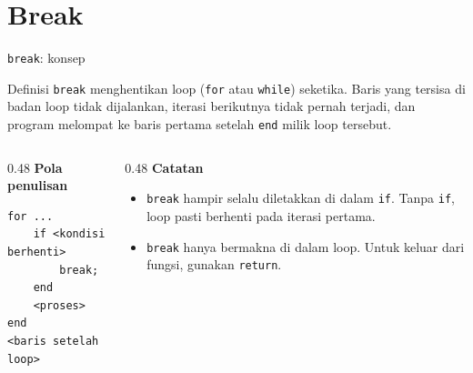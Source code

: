\documentclass[aspectratio=169,10pt]{beamer}
\newcommand{\kode}[1]{\texttt{#1}}
\begin{document}
\section{Break}

\begin{frame}[fragile]{\kode{break}: konsep}
  \begin{block}{Definisi}
    \kode{break} menghentikan loop (\kode{for} atau \kode{while}) \alert{seketika}. Baris yang tersisa
    di badan loop tidak dijalankan, iterasi berikutnya tidak pernah terjadi, dan program melompat ke
    \alert{baris pertama setelah \kode{end}} milik loop tersebut.
  \end{block}
  \vspace{4pt}
  \begin{columns}[T]
    \begin{column}{0.48\textwidth}
      \textbf{Pola penulisan}
\begin{lstlisting}
for ...
    if <kondisi berhenti>
        break;
    end
    <proses>
end
<baris setelah loop>
\end{lstlisting}
    \end{column}
    \begin{column}{0.48\textwidth}
      \textbf{Catatan}
      \begin{itemize}
        \item \kode{break} hampir selalu diletakkan di dalam \kode{if}. Tanpa \kode{if}, loop pasti berhenti pada iterasi pertama.
        \item \kode{break} hanya bermakna di dalam loop. Untuk keluar dari fungsi, gunakan \kode{return}.
      \end{itemize}
    \end{column}
  \end{columns}
\end{frame}
\end{document}
